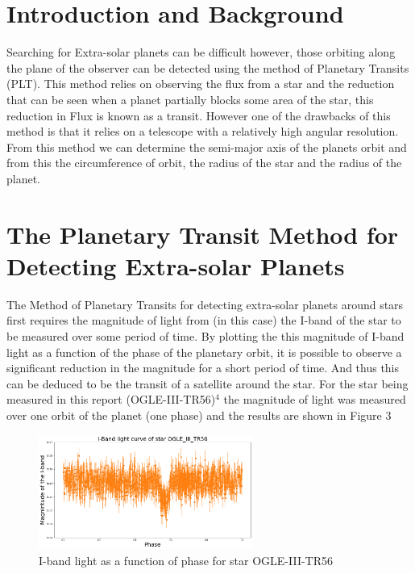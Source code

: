 \documentclass[]{article}
\begin{document}
\section*{Introduction and Background}
Searching for Extra-solar planets can be difficult however, 
those orbiting along the plane of the observer can be 
detected using the method of Planetary Transits (PLT).
This method relies on observing the flux from a star and the 
reduction that can be seen when a planet partially blocks some 
area of the star, this reduction in Flux is known as a transit.
However one of the drawbacks of this method is that it relies on 
a telescope with a relatively high angular resolution. 
From this method we can determine the semi-major axis of the planets
orbit and from this the circumference of orbit, the radius of the star
and the radius of the planet.
\par



\section*{The Planetary Transit Method for Detecting Extra-solar Planets}
The Method of Planetary Transits for detecting extra-solar planets
around stars first requires
the magnitude of light from (in this case) the I-band of 
the star to be measured over some period of time.
By plotting the this magnitude of I-band light as a 
function of the phase of the planetary orbit, it is 
possible to observe a significant reduction in the 
magnitude for a short period of time. And thus this can be 
deduced to be the transit of a satellite around the star.
For the star being measured in this report (OGLE-III-TR56)$^4$
the magnitude of light was measured over one orbit of the 
planet (one phase) and the results are shown in Figure 3

\begin{figure}[h]
  \includegraphics[width=7cm]{images/I-band_curve.png}
  \caption{I-band light as a function of phase for star OGLE-III-TR56}
  \label{fig:HD-_init}
  \end{figure}
\end{document}
